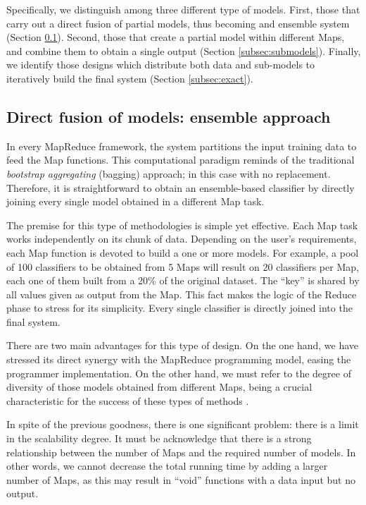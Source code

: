\documentclass[3p,review]{elsarticle}
\begin{document}
Specifically, we distinguish among three different type of models. First, those that carry out a direct fusion of partial models, thus becoming and ensemble system (Section \ref{subsec:ensemble}). Second, those that create a partial model within different Maps, and combine them to obtain a single output (Section \ref{subsec:submodels}). Finally, we identify those designs which distribute both data and sub-models to iteratively build the final system (Section \ref{subsec:exact}).

\subsection{Direct fusion of models: ensemble approach}\label{subsec:ensemble}

In every MapReduce framework, the system partitions the input training data to feed the Map functions. This computational paradigm reminds of the traditional \textit{bootstrap aggregating} (bagging) approach; in this case with no replacement. Therefore, it is straightforward to obtain an ensemble-based classifier \cite{Polikar2006} by directly joining every single model obtained in a different Map task. 

The premise for this type of methodologies is simple yet effective. Each Map task works independently on its chunk of data. Depending on the user's requirements, each Map function is devoted to build a one or more models. For example, a pool of 100 classifiers to be obtained from 5 Maps will result on 20 classifiers per Map, each one of them built from a 20\% of the original dataset. The ``key'' is shared by all values given as output from the Map. This fact makes the logic of the Reduce phase to stress for its simplicity. Every single classifier is directly joined into the final system. 

There are two main advantages for this type of design. On the one hand, we have stressed its direct synergy with the MapReduce programming model, easing the programmer implementation. On the other hand, we must refer to the degree of diversity of those models obtained from different Maps, being a crucial characteristic for the success of these types of methods \cite{Kuncheva05}. 

In spite of the previous goodness, there is one significant problem: there is a limit in the scalability degree. It must be acknowledge that there is a strong relationship between the number of Maps and the required number of models. In other words, we cannot decrease the total running time by adding a larger number of Maps, as this may result in ``void'' functions with a data input but no output. 
\end{document}
